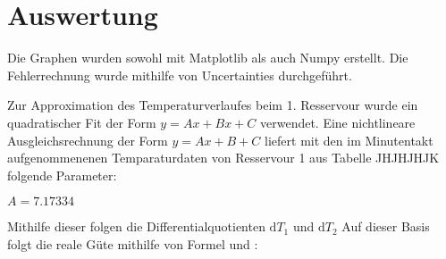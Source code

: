 \section{Auswertung}
\label{sec:Auswertung}
Die Graphen wurden sowohl mit Matplotlib als auch Numpy erstellt. Die
 Fehlerrechnung wurde mithilfe von Uncertainties durchgeführt.





 Zur Approximation des Temperaturverlaufes beim 1. Resservour wurde ein
 quadratischer Fit der Form $y = Ax+Bx+C$ verwendet. Eine nichtlineare
 Ausgleichsrechnung der Form $y = Ax+B+C$ liefert mit den im Minutentakt
 aufgenommenenen Temparaturdaten von Resservour 1 aus Tabelle JHJHJHJK folgende Parameter:

$A = 7.17334$

Mithilfe dieser folgen die Differentialquotienten $\text{d}T_1$ und $\text{d}T_2$
Auf dieser Basis folgt die reale Güte mithilfe von Formel \cite{eq:Q1T1} und \cite{eq:v}:
